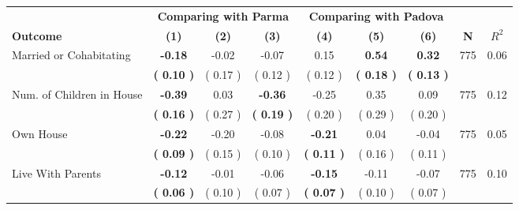 \begin{tabular}{lcccccccc}
\toprule
 & \multicolumn{3}{c}{\textbf{Comparing with Parma}} & \multicolumn{3}{c}{\textbf{Comparing with Padova}} & \\
\cmidrule(lr){2-4} \cmidrule(lr){5-7} 
 \textbf{Outcome} & \textbf{(1)} & \textbf{(2)} & \textbf{(3)} & \textbf{(4)} & \textbf{(5)} & \textbf{(6)} & \textbf{N} & \textbf{$ R^2$} \\
\midrule
Married or Cohabitating & \textbf{    -0.18} &     -0.02 &     -0.07 &      0.15 & \textbf{     0.54} & \textbf{     0.32} & 775 &       0.06 \\ 
 & \textbf{(     0.10 )} & (     0.17 ) & (     0.12 ) & (     0.12 ) & \textbf{(     0.18 )} & \textbf{(     0.13 )} & \\
Num. of Children in House & \textbf{    -0.39} &      0.03 & \textbf{    -0.36} &     -0.25 &      0.35 &      0.09 & 775 &       0.12 \\ 
 & \textbf{(     0.16 )} & (     0.27 ) & \textbf{(     0.19 )} & (     0.20 ) & (     0.29 ) & (     0.20 ) & \\
Own House & \textbf{    -0.22} &     -0.20 &     -0.08 & \textbf{    -0.21} &      0.04 &     -0.04 & 775 &       0.05 \\ 
 & \textbf{(     0.09 )} & (     0.15 ) & (     0.10 ) & \textbf{(     0.11 )} & (     0.16 ) & (     0.11 ) & \\
Live With Parents & \textbf{    -0.12} &     -0.01 &     -0.06 & \textbf{    -0.15} &     -0.11 &     -0.07 & 775 &       0.10 \\ 
 & \textbf{(     0.06 )} & (     0.10 ) & (     0.07 ) & \textbf{(     0.07 )} & (     0.10 ) & (     0.07 ) & \\
\bottomrule
\end{tabular}
